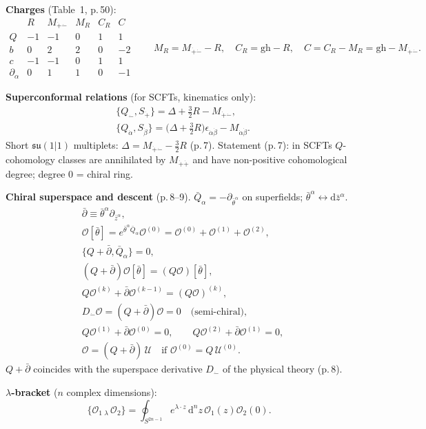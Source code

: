 \documentclass[11pt]{article}
\newcommand{\dm}{\dot{-}}
\newcommand{\dpl}{\dot{+}}
\newcommand{\pb}{\bar{\partial}}
\newcommand{\cO}{\mathcal{O}}
\begin{document}
\textbf{Charges} (Table~1, p.\,50):
\[
\begin{array}{c|ccccc}
 & R & M_{\dpl\dm} & M_R & C_R & C\\\hline
Q & -1 & -1 & 0 & 1 & 1\\
b & 0 & 2 & 2 & 0 & -2\\
c & -1 & -1 & 0 & 1 & 1\\
\partial_\alpha & 0 & 1 & 1 & 0 & -1
\end{array}
\qquad M_R=M_{\dpl\dm}-R,\quad C_R=\mathrm{gh}-R,\quad C=C_R-M_R=\mathrm{gh}-M_{\dpl\dm}.
\]

\textbf{Superconformal relations} (for SCFTs, kinematics only):
\begin{align}
&\{Q_{\dm},S_{\dpl}\}=\Delta+\tfrac32R-M_{\dpl\dm}, \tag{2.4}\\
&\{Q_{\dot\alpha},S_{\dot\beta}\}=\big(\Delta+\tfrac32R\big)\epsilon_{\dot\alpha\dot\beta}-M_{\dot\alpha\dot\beta}. \tag{2.5}
\end{align}
Short $\mathfrak{su}(1|1)$ multiplets: $\Delta=M_{\dpl\dm}-\frac32R$ (p.\,7). Statement (p.\,7): in SCFTs $Q$-cohomology classes are annihilated by $M_{\dpl\dpl}$ and have non-positive cohomological degree; degree $0$ = chiral ring.

\textbf{Chiral superspace and descent} (p.\,8--9). $\bar Q_\alpha=-\partial_{\bar\theta^\alpha}$ on superfields; $\bar\theta^\alpha\leftrightarrow\mathrm d\bar z^\alpha$.
\begin{align}
&\pb\equiv\bar\theta^\alpha\partial_{\bar z^\alpha}, \tag{2.6}\\
&\cO[\bar\theta]=e^{\bar\theta^\alpha\bar Q_\alpha}\cO^{(0)}=\cO^{(0)}+\cO^{(1)}+\cO^{(2)}, \tag{2.7}\\
&\{Q+\pb,\bar Q_\alpha\}=0, \tag{2.8}\\
&(Q+\pb)\cO[\bar\theta]=(Q\cO)[\bar\theta], \tag{2.9}\\
&Q\cO^{(k)}+\pb\cO^{(k-1)}=(Q\cO)^{(k)}, \tag{2.10}\\
&D_{\dm}\cO=(Q+\pb)\cO=0\quad\text{(semi-chiral)}, \tag{2.11}\\
&Q\cO^{(1)}+\pb\cO^{(0)}=0,\qquad Q\cO^{(2)}+\pb\cO^{(1)}=0, \tag{2.12}\\
&\cO=(Q+\pb)\,\mathcal U\quad\text{if }\cO^{(0)}=Q\,\mathcal U^{(0)}. \tag{2.13}
\end{align}
$Q+\pb$ coincides with the superspace derivative $D_{\dm}$ of the physical theory (p.\,8).

\textbf{$\lambda$-bracket} ($n$ complex dimensions):
\begin{equation}
\{\cO_1\,{}_\lambda\,\cO_2\}=\oint_{S^{2n-1}}e^{\lambda\cdot z}\,\mathrm d^nz\,\cO_1(z)\cO_2(0). \tag{2.18}
\end{equation}
\end{document}
